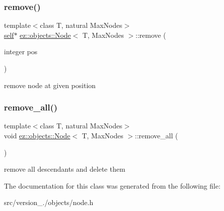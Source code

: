 \mbox{\label{classez_1_1objects_1_1Node_a6b86a03d9be4c515e624fe01f873ce8b}} 
\subsubsection{\texorpdfstring{remove()}{remove()}}
{\footnotesize\ttfamily template$<$class T, natural Max\+Nodes$>$ \\
\hyperlink{classez_1_1objects_1_1Node}{self}$\ast$ \hyperlink{classez_1_1objects_1_1Node}{ez\+::objects\+::\+Node}$<$ T, Max\+Nodes $>$\+::remove (\begin{DoxyParamCaption}\item[{integer}]{pos }\end{DoxyParamCaption})\hspace{0.3cm}{\ttfamily [inline]}}

remove node at given position \mbox{\label{classez_1_1objects_1_1Node_aa6267eadf5df3a5e855d3cceec037653}} 
\subsubsection{\texorpdfstring{remove\+\_\+all()}{remove\_all()}}
{\footnotesize\ttfamily template$<$class T, natural Max\+Nodes$>$ \\
void \hyperlink{classez_1_1objects_1_1Node}{ez\+::objects\+::\+Node}$<$ T, Max\+Nodes $>$\+::remove\+\_\+all (\begin{DoxyParamCaption}{ }\end{DoxyParamCaption})\hspace{0.3cm}{\ttfamily [inline]}}

remove all descendants and delete them 

The documentation for this class was generated from the following file\+:\begin{DoxyCompactItemize}
\item 
src/version\+\_./objects/node.\+h\end{DoxyCompactItemize}
